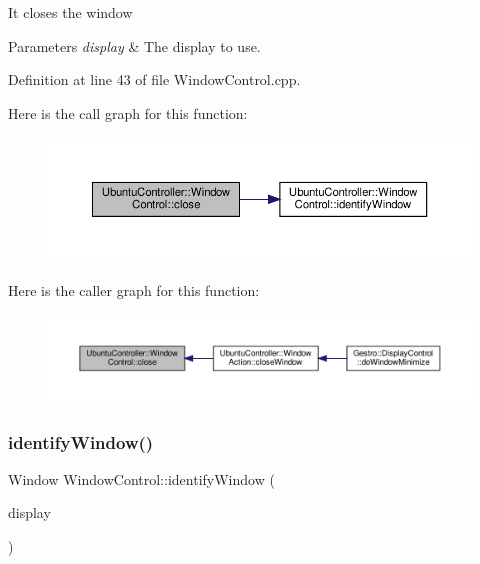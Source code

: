 It closes the window


\begin{DoxyParams}{Parameters}
{\em display} & The display to use. \\
\hline
\end{DoxyParams}


Definition at line 43 of file Window\+Control.\+cpp.

Here is the call graph for this function\+:
\nopagebreak
\begin{figure}[H]
\begin{center}
\leavevmode
\includegraphics[width=350pt]{class_ubuntu_controller_1_1_window_control_a2f521062be8be113d1cbcca4f495d693_cgraph}
\end{center}
\end{figure}
Here is the caller graph for this function\+:
\nopagebreak
\begin{figure}[H]
\begin{center}
\leavevmode
\includegraphics[width=350pt]{class_ubuntu_controller_1_1_window_control_a2f521062be8be113d1cbcca4f495d693_icgraph}
\end{center}
\end{figure}
\mbox{\label{class_ubuntu_controller_1_1_window_control_aad092a22b19664df4d94fe9a853d350a}} 
\subsubsection{\texorpdfstring{identify\+Window()}{identifyWindow()}}
{\footnotesize\ttfamily Window Window\+Control\+::identify\+Window (\begin{DoxyParamCaption}\item[{Display $\ast$}]{display }\end{DoxyParamCaption})}

